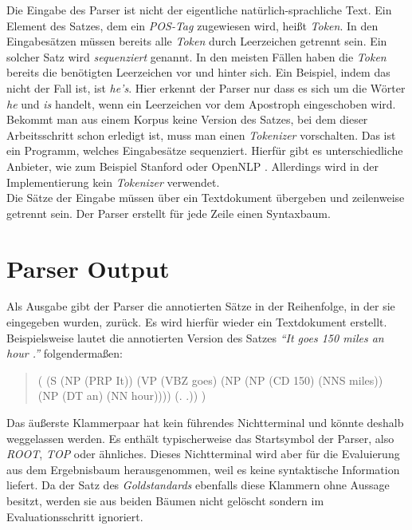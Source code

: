 Die Eingabe des Parser ist nicht der eigentliche natürlich-sprachliche Text. Ein Element des Satzes, dem ein \textit{POS-Tag} zugewiesen wird, heißt \textit{Token}. In den Eingabesätzen müssen bereits alle \textit{Token} durch Leerzeichen getrennt sein. Ein solcher Satz wird \textit{sequenziert} genannt. In den meisten Fällen haben die \textit{Token} bereits die benötigten Leerzeichen vor und hinter sich. Ein Beispiel, indem das nicht der Fall ist, ist \textit{he's}. Hier erkennt der Parser nur dass es sich um die Wörter \textit{he} und \textit{is} handelt, wenn ein Leerzeichen vor dem Apostroph eingeschoben wird. Bekommt man aus einem Korpus keine Version des Satzes, bei dem dieser Arbeitsschritt schon erledigt ist, muss man einen \textit{Tokenizer} vorschalten. Das ist ein Programm, welches Eingabesätze sequenziert. Hierfür gibt es unterschiedliche Anbieter, wie zum Beispiel Stanford \cite{stanfordTokenizer} oder OpenNLP \cite{openNlpManual}. 
Allerdings wird in der Implementierung kein \textit{Tokenizer} verwendet. \\
Die Sätze der Eingabe müssen über ein Textdokument übergeben und zeilenweise getrennt sein. Der Parser erstellt für jede Zeile einen Syntaxbaum.

\section{Parser Output}
Als Ausgabe gibt der Parser die annotierten Sätze in der Reihenfolge, in der sie eingegeben wurden, zurück. Es wird hierfür wieder ein Textdokument erstellt. %
Beispielsweise lautet die annotierten Version des Satzes \textit{``It goes 150 miles an hour .''} folgendermaßen:
\begin{quote}
( (S (NP (PRP It)) (VP (VBZ goes) (NP (NP (CD 150) (NNS miles)) \\(NP (DT an) (NN hour)))) (. .)) )
\end{quote}
Das äußerste Klammerpaar hat kein führendes Nichtterminal und könnte deshalb weggelassen werden. Es enthält typischerweise das Startsymbol der Parser, also \textit{ROOT}, \textit{TOP} oder ähnliches. Dieses Nichtterminal wird aber für die Evaluierung aus dem Ergebnisbaum herausgenommen, weil es keine syntaktische Information liefert. Da der Satz des \textit{Goldstandards} ebenfalls diese Klammern ohne Aussage besitzt, werden sie aus beiden Bäumen nicht gelöscht sondern im Evaluationsschritt ignoriert.
